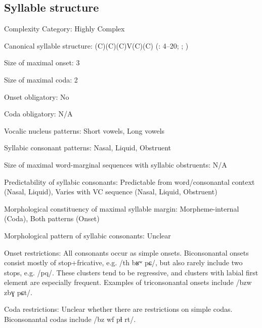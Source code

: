 {\subsection*{Syllable structure}
\begin{appendixdesc}

\item[Complexity Category:] Highly Complex

\item[Canonical syllable structure:] (C)(C)(C)V(C)(C) (\citealt{Colarusso2006}: 4--20; \citealt[13]{Matasović2010}; \citealt{Applebaum2013})

\item[Size of maximal onset:] 3

\item[Size of maximal coda:] 2

\item[Onset obligatory:] No

\item[Coda obligatory:] N/A

\item[Vocalic nucleus patterns:] Short vowels, Long vowels

\item[Syllabic consonant patterns:] Nasal, Liquid, Obstruent

\item[Size of maximal word-marginal sequences with syllabic obstruents:] N/A

\item[Predictability of syllabic consonants:] Predictable from word/consonantal context (Nasal, Liquid), Varies with VC sequence (Nasal, Liquid, Obstruent)

\item[Morphological constituency of maximal syllable margin:] Morpheme-internal (Coda), Both patterns (Onset)

\item[Morphological pattern of syllabic consonants:] Unclear

\item[Onset restrictions:] All consonants occur as simple onsets. Biconsonantal onsets consist mostly of stop+fricative, e.g. /th bʁʷ pɕ/, but also rarely include two stops, e.g. /pq/. These clusters tend to be regressive, and clusters with labial first element are especially frequent. Examples of triconsonantal onsets include /bzw zbɣ pɕt/.

\item[Coda restrictions:] Unclear whether there are restrictions on simple codas. Biconsonantal codas include /bz wf pɬ rt/.


\end{appendixdesc}}
